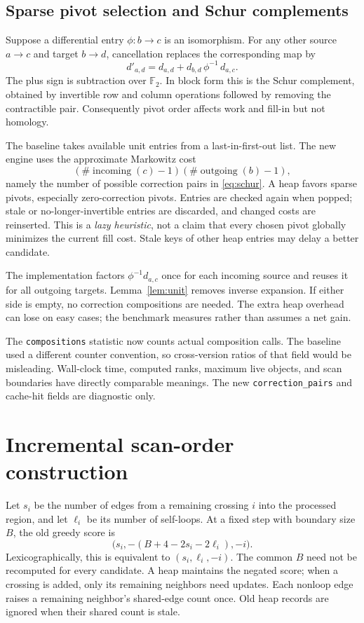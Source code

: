 \documentclass[11pt]{article}
\theoremstyle{remark}\newtheorem{remark}[theorem]{Remark}
\newcommand{\F}{\mathbb F}
\newcommand{\code}[1]{\texttt{\small #1}}
\begin{document}
\subsection{Sparse pivot selection and Schur complements}

Suppose a differential entry $\phi:b\to c$ is an isomorphism. For any other
source $a\to c$ and target $b\to d$, cancellation replaces the corresponding
map by
\begin{equation}\label{eq:schur}
 d'_{a,d}=d_{a,d}+d_{b,d}\,\phi^{-1}\,d_{a,c}.
\end{equation}
The plus sign is subtraction over $\F_2$. In block form this is the Schur
complement, obtained by invertible row and column operations followed by
removing the contractible pair. Consequently pivot order affects work and
fill-in but not homology.

The baseline takes available unit entries from a last-in-first-out list.
The new engine uses the approximate Markowitz cost
\[
  (\#\operatorname{incoming}(c)-1)
  (\#\operatorname{outgoing}(b)-1),
\]
namely the number of possible correction pairs in \eqref{eq:schur}. A heap
favors sparse pivots, especially zero-correction pivots. Entries are checked
again when popped; stale or no-longer-invertible entries are discarded,
and changed costs are reinserted. This is a \emph{lazy heuristic}, not a
claim that every chosen pivot globally minimizes the current fill cost.
Stale keys of other heap entries may delay a better candidate.

The implementation factors $\phi^{-1}d_{a,c}$ once for each incoming source
and reuses it for all outgoing targets. Lemma~\ref{lem:unit} removes inverse
expansion. If either side is empty, no correction compositions are needed.
The extra heap overhead can lose on easy cases; the benchmark measures
rather than assumes a net gain.

The \code{compositions} statistic now counts actual composition calls.
The baseline used a different counter convention, so cross-version ratios
of that field would be misleading. Wall-clock time, computed ranks,
maximum live objects, and scan boundaries have directly comparable meanings.
The new \code{correction\_pairs} and cache-hit fields are diagnostic only.

\section{Incremental scan-order construction}

Let $s_i$ be the number of edges from a remaining crossing $i$ into the
processed region, and let $\ell_i$ be its number of self-loops. At a fixed
step with boundary size $B$, the old greedy score is
\[
 \bigl(s_i,-(B+4-2s_i-2\ell_i),-i\bigr).
\]
Lexicographically, this is equivalent to $(s_i,\ell_i,-i)$. The common
$B$ need not be recomputed for every candidate. A heap maintains the
negated score; when a crossing is added, only its remaining neighbors
need updates. Each nonloop edge raises a remaining neighbor's shared-edge
count once. Old heap records are ignored when their shared count is stale.
\end{document}
